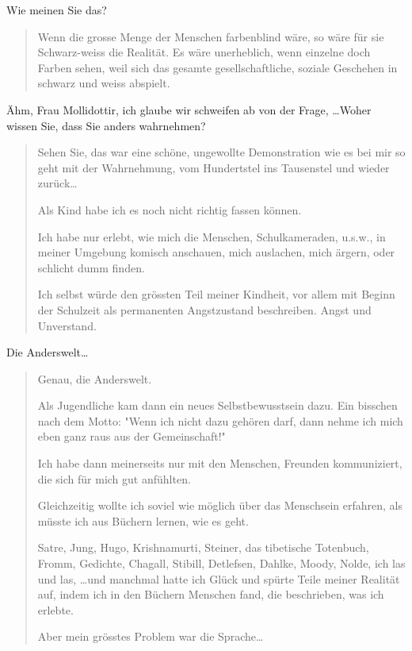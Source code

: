 \documentclass[10pt,titlepage,a5paper]{book}
\newenvironment{tg}{\begin{quote}\em}{\end{quote}}
\begin{document}
 Wie meinen Sie das?
 
 \begin{tg}
 
 Wenn die grosse Menge der Menschen farbenblind wäre, so wäre für sie Schwarz-weiss die Realität. Es wäre unerheblich, wenn einzelne doch Farben sehen, weil sich das gesamte gesellschaftliche, soziale Geschehen in schwarz und weiss abspielt.
 
 \end{tg}
 
Ähm, Frau Mollidottir, ich glaube wir schweifen ab von der Frage, \dots Woher wissen Sie, dass Sie anders wahrnehmen?

\begin{tg}

Sehen Sie, das war eine schöne, ungewollte Demonstration wie es bei  mir so geht mit der Wahrnehmung, vom Hundertstel ins Tausenstel und wieder zurück\dots 

Als Kind habe ich es noch nicht richtig fassen können.

Ich habe nur erlebt, wie mich die Menschen, Schulkameraden, u.s.w., in meiner Umgebung komisch anschauen, mich auslachen, mich ärgern, oder schlicht dumm finden.

Ich selbst würde den grössten Teil meiner Kindheit, vor allem mit Beginn der Schulzeit als permanenten Angstzustand beschreiben. Angst und Unverstand.

\end{tg}
 
 Die Anderswelt\dots 
 
 \begin{tg}
 
 Genau, die Anderswelt.
 
 Als Jugendliche kam dann ein neues Selbstbewusstsein dazu. Ein bisschen nach dem Motto: "Wenn ich nicht dazu gehören darf, dann nehme ich mich eben ganz raus aus der Gemeinschaft!"
 
 Ich habe dann meinerseits nur mit den Menschen, Freunden kommuniziert, die sich für mich gut anfühlten.
 
 Gleichzeitig wollte ich soviel wie möglich über das Menschsein erfahren, als müsste ich aus Büchern lernen, wie es geht.
 
 Satre, Jung, Hugo, Krishnamurti, Steiner, das tibetische Totenbuch, Fromm, Gedichte, Chagall, Stibill, Detlefsen, Dahlke, Moody, Nolde, ich las und las, \dots und manchmal hatte ich Glück und spürte Teile meiner Realität auf, indem ich in den Büchern Menschen fand, die beschrieben, was ich erlebte.
 
 Aber mein grösstes Problem war die Sprache\dots 
 
 \end{tg}
 
\end{document}
